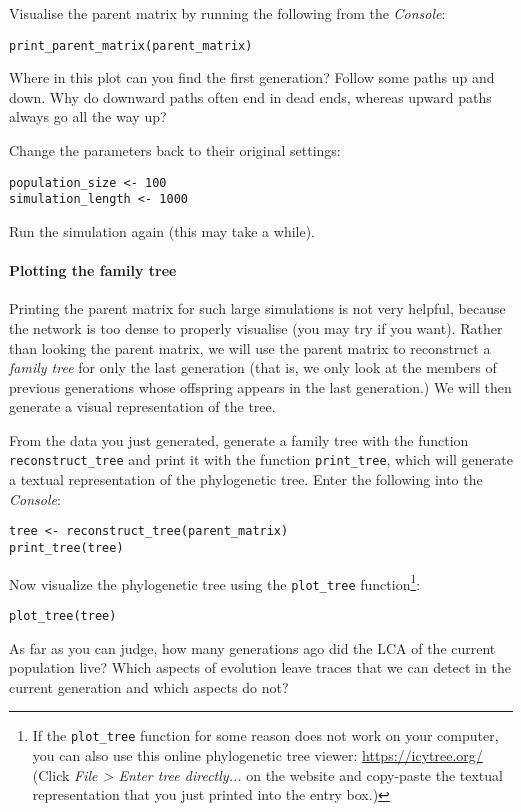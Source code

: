 \documentclass[a4paper, 9pt]{article}
\begin{document}
\begin{exercise}
\action Visualise the parent matrix by running the following from the \emph{Console}:
\begin{lstlisting}
print_parent_matrix(parent_matrix)
\end{lstlisting}
Where in this plot can you find the first generation?
\askstar Follow some paths up and down. Why do downward paths often end in dead ends, whereas upward paths always go all the way up?
\end{exercise}

\begin{exercise}
\action Change the parameters back to their original settings:\begin{lstlisting}
population_size <- 100
simulation_length <- 1000
\end{lstlisting}
\action Run the simulation again (this may take a while).
\end{exercise}

\paragraph{Plotting the family tree} Printing the parent matrix for such large simulations is not very helpful, because the network is too dense to properly visualise (you may try if you want). Rather than looking the parent matrix, we will use the parent matrix to reconstruct a \emph{family tree} for only the last generation (that is, we only look at the members of previous generations whose offspring appears in the last generation.) We will then generate a visual representation of the tree.

\begin{exercise}
\action From the data you just generated, generate a family tree with the function \verb|reconstruct_tree| and print it with the function \verb|print_tree|, which will generate a textual representation of the phylogenetic tree. Enter the following into the \emph{Console}:
\begin{lstlisting}
tree <- reconstruct_tree(parent_matrix)
print_tree(tree)
\end{lstlisting}
\action Now visualize the phylogenetic tree using the \verb|plot_tree| function\footnote{If the \texttt{plot\_tree} function for some reason does not work on your computer, you can also use this online phylogenetic tree viewer: \url{https://icytree.org/} (Click \emph{File > Enter tree directly...} on the website and copy-paste the textual representation that you just printed into the entry box.)}:
\begin{lstlisting}
plot_tree(tree)
\end{lstlisting}
\askstar As far as you can judge, how many generations ago did the LCA of the current population live?
\askstar Which aspects of evolution leave traces that we can detect in the current generation and which aspects do not?
\end{exercise}
\end{document}
